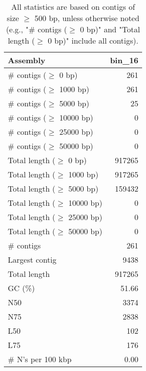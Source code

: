 \documentclass[12pt,a4paper]{article}
\begin{document}
\begin{table}[ht]
\begin{center}
\caption{All statistics are based on contigs of size $\geq$ 500 bp, unless otherwise noted (e.g., "\# contigs ($\geq$ 0 bp)" and "Total length ($\geq$ 0 bp)" include all contigs).}
\begin{tabular}{|l*{1}{|r}|}
\hline
Assembly & bin\_16 \\ \hline
\# contigs ($\geq$ 0 bp) & 261 \\ \hline
\# contigs ($\geq$ 1000 bp) & 261 \\ \hline
\# contigs ($\geq$ 5000 bp) & 25 \\ \hline
\# contigs ($\geq$ 10000 bp) & 0 \\ \hline
\# contigs ($\geq$ 25000 bp) & 0 \\ \hline
\# contigs ($\geq$ 50000 bp) & 0 \\ \hline
Total length ($\geq$ 0 bp) & 917265 \\ \hline
Total length ($\geq$ 1000 bp) & 917265 \\ \hline
Total length ($\geq$ 5000 bp) & 159432 \\ \hline
Total length ($\geq$ 10000 bp) & 0 \\ \hline
Total length ($\geq$ 25000 bp) & 0 \\ \hline
Total length ($\geq$ 50000 bp) & 0 \\ \hline
\# contigs & 261 \\ \hline
Largest contig & 9438 \\ \hline
Total length & 917265 \\ \hline
GC (\%) & 51.66 \\ \hline
N50 & 3374 \\ \hline
N75 & 2838 \\ \hline
L50 & 102 \\ \hline
L75 & 176 \\ \hline
\# N's per 100 kbp & 0.00 \\ \hline
\end{tabular}
\end{center}
\end{table}
\end{document}

